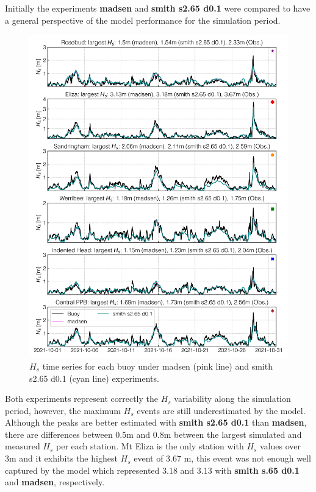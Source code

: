 \documentclass[12pt]{article}
\begin{document}
Initially the experiments \textbf{madsen} and \textbf{smith s2.65 d0.1} were compared to have a general perspective of the model performance for the simulation period. 

\begin{figure}[H]
    \centering
    \includegraphics[scale=0.7]{plots/hs_series/madsen_vs_smith s2.65 d0.1_vert.png}
    \caption{$H_{s}$ time series for each buoy under madsen (pink line) and smith s2.65 d0.1 (cyan line) experiments.}
    \label{fig:hs_madsen_vs_smith_def}
\end{figure}

Both experiments represent correctly the $H_s$ variability along the simulation period, however, the maximum $H_s$ events are still underestimated by the model. Although the peaks are better estimated with \textbf{smith s2.65 d0.1} than \textbf{madsen}, there are differences between 0.5m and 0.8m between the largest simulated and measured $H_s$ per each station. Mt Eliza is the only station with $H_s$ values over 3m and it exhibits the highest $H_s$ event of 3.67 m, this event was not enough well captured by the model which represented 3.18 and 3.13 with \textbf{smith s.65 d0.1} and \textbf{madsen}, respectively.
\end{document}
